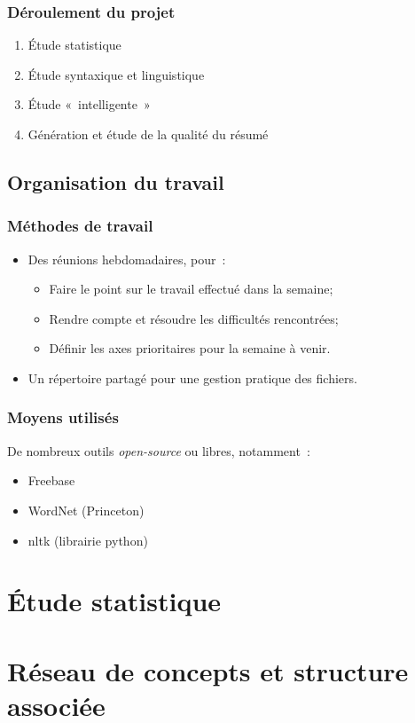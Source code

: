 \documentclass{beamer}
\begin{document}
\begin{frame}
\frametitle{Déroulement du projet}

\begin{enumerate}
\item Étude statistique
\item Étude syntaxique et linguistique
\item Étude «~intelligente~»
\item Génération et étude de la qualité du résumé
\end{enumerate}

\end{frame}

\subsection{Organisation du travail}

\begin{frame}
\frametitle{Méthodes de travail}
	\begin{itemize}
		\item Des réunions hebdomadaires, pour~:
		\begin{itemize}
			\item Faire le point sur le travail effectué dans la semaine;
			\item Rendre compte et résoudre les difficultés rencontrées;
			\item Définir les axes prioritaires pour la semaine à venir.
		\end{itemize}
		\item Un répertoire partagé pour une gestion pratique des fichiers.
	\end{itemize}
\end{frame}

\begin{frame}
\frametitle{Moyens utilisés}

De nombreux outils \textit{open-source} ou libres, notamment~:
\begin{itemize}
 \item Freebase
 \item WordNet (Princeton)
 \item nltk (librairie python)
\end{itemize}
\end{frame}



\section{Étude statistique}%

\section{Réseau de concepts et structure associée}%
\end{document}
